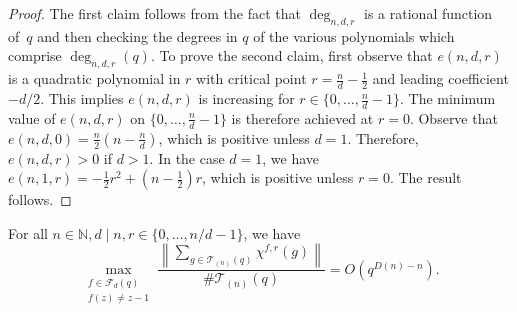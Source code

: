\documentclass[Unicode,ALCO]{cedram}
\newcommand{\CF}{\mathcal{F}}
\newcommand{\N}{\mathbb{N}}
\newcommand{\CT}{\mathcal{T}}
\begin{document}
\begin{proof}
The first claim follows from the fact that \(\deg_{n,d,r}\) is a rational function of~\(q\) and then checking the degrees in \(q\) of the various polynomials which comprise \(\deg_{n,d,r} (q)\).
To prove the second claim, first observe that \(e(n,d,r)\) is a quadratic polynomial in \(r\) with critical point \(r = \tfrac{n}{d} - \tfrac{1}{2}\) and leading coefficient \(-d/2\).
This implies \(e(n,d,r)\) is increasing for \(r \in \{0,\ldots,\tfrac{n}{d}-1\}\).
The minimum value of \(e(n,d,r)\) on \(\{0,\ldots,\tfrac{n}{d}-1\}\) is therefore achieved at \(r = 0\).
Observe that \(e(n,d,0) = \tfrac{n}{2}\left ( n - \tfrac{n}{d}\right )\), which is positive unless \(d = 1\).
Therefore, \(e(n,d,r) > 0\) if \(d > 1\).
In the case \(d = 1\), we have \(e(n,1,r) = -\tfrac{1}{2}r^2 + (n-\tfrac{1}{2})r\), which is positive unless \(r = 0\).
The result follows.
\end{proof}







\begin{lemma}
\label{helvetica_scenario}
For all \(n \in \N, d \mid n, r \in \{0,\ldots,n/d-1\}\), we have
\begin{equation}
\max_{\substack{f \in \CF_d (q) \\ f(z) \neq z-1}}
\frac{\left \| \sum_{g \in \CT_{(n)}(q)} \chi^{f,r}(g) \right \|}{\# \CT_{(n)}(q)}
=
O \left ( q^{D(n)-n} \right ).
\end{equation}
\end{lemma}
\end{document}
